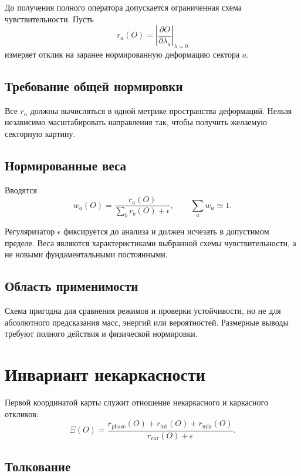 До получения полного оператора допускается ограниченная схема чувствительности.
Пусть
\begin{equation}
 r_a(O)=\left|\frac{\partial O}{\partial\lambda_a}\right|_{\lambda=0}
\end{equation}
измеряет отклик на заранее нормированную деформацию сектора $a$.

\section{Требование общей нормировки}

Все $r_a$ должны вычисляться в одной метрике пространства деформаций. Нельзя
независимо масштабировать направления так, чтобы получить желаемую секторную
картину.

\section{Нормированные веса}

Вводятся
\begin{equation}
 w_a(O)=\frac{r_a(O)}{\sum_b r_b(O)+\epsilon},
 \qquad \sum_a w_a\simeq1.
\end{equation}

Регуляризатор $\epsilon$ фиксируется до анализа и должен исчезать в допустимом
пределе. Веса являются характеристиками выбранной схемы чувствительности, а
не новыми фундаментальными постоянными.

\section{Область применимости}

Схема пригодна для сравнения режимов и проверки устойчивости, но не для
абсолютного предсказания масс, энергий или вероятностей. Размерные выводы
требуют полного действия и физической нормировки.

\chapter{Инвариант некаркасности}

Первой координатой карты служит отношение некаркасного и каркасного откликов:
\begin{equation}
 \Xi(O)=
 \frac{r_{\mathrm{phase}}(O)+r_{\mathrm{int}}(O)+r_{\mathrm{mix}}(O)}
 {r_{\mathrm{car}}(O)+\epsilon}.
\end{equation}

\section{Толкование}


